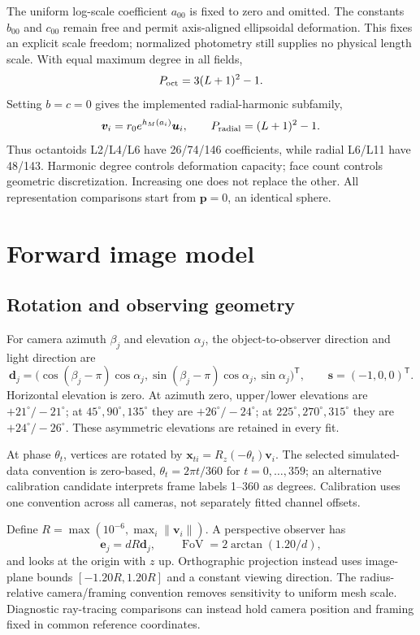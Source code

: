 \documentclass[10pt,a4paper]{article}
\newcommand{\vect}[1]{\bm{#1}}
\begin{document}
The uniform log-scale coefficient $a_{00}$ is fixed to zero and omitted.
The constants $b_{00}$ and $c_{00}$ remain free and permit axis-aligned
ellipsoidal deformation. This fixes an explicit scale freedom; normalized
photometry still supplies no physical length scale. With equal maximum
degree in all fields,
\begin{equation}
 P_{\rm oct}=3(L+1)^2-1.
\end{equation}
Setting $b=c=0$ gives the implemented radial-harmonic subfamily,
\begin{equation}
 \vect v_i=r_0e^{h_M(a_i)}\vect u_i,\qquad
 P_{\rm radial}=(L+1)^2-1.
\end{equation}
Thus octantoids L2/L4/L6 have 26/74/146 coefficients, while radial L6/L11
have 48/143. Harmonic degree controls deformation capacity; face count
controls geometric discretization. Increasing one does not replace the other.
All representation comparisons start from $\vect p=0$, an identical sphere.

\section{Forward image model}
\subsection{Rotation and observing geometry}
For camera azimuth $\beta_j$ and elevation $\alpha_j$, the
object-to-observer direction and light direction are
\begin{equation}
 \vect d_j=\bigl(\cos(\beta_j-\pi)\cos\alpha_j,
 \sin(\beta_j-\pi)\cos\alpha_j,\sin\alpha_j\bigr)^\mathsf T,
 \qquad \vect s=(-1,0,0)^\mathsf T.
\end{equation}
Horizontal elevation is zero. At azimuth zero, upper/lower elevations
are $+21^\circ/-21^\circ$; at $45^\circ,90^\circ,135^\circ$ they are
$+26^\circ/-24^\circ$; at $225^\circ,270^\circ,315^\circ$ they are
$+24^\circ/-26^\circ$. These asymmetric elevations are retained in every fit.

At phase $\theta_t$, vertices are rotated by
$\vect x_{ti}=R_z(-\theta_t)\vect v_i$.
The selected simulated-data convention is zero-based,
$\theta_t=2\pi t/360$ for $t=0,\ldots,359$; an alternative calibration candidate interprets
frame labels 1--360 as degrees. Calibration uses one convention across
all cameras, not separately fitted channel offsets.

Define $R=\max(10^{-6},\max_i\|\vect v_i\|)$. A perspective observer has
\begin{equation}
 \vect e_j=dR\vect d_j,\qquad
 \operatorname{FoV}=2\arctan(1.20/d),
\end{equation}
and looks at the origin with $z$ up. Orthographic projection instead uses
image-plane bounds $[-1.20R,1.20R]$ and a constant viewing direction.
The radius-relative camera/framing convention removes sensitivity to
uniform mesh scale. Diagnostic ray-tracing comparisons can instead hold
camera position and framing fixed in common reference coordinates.
\end{document}
